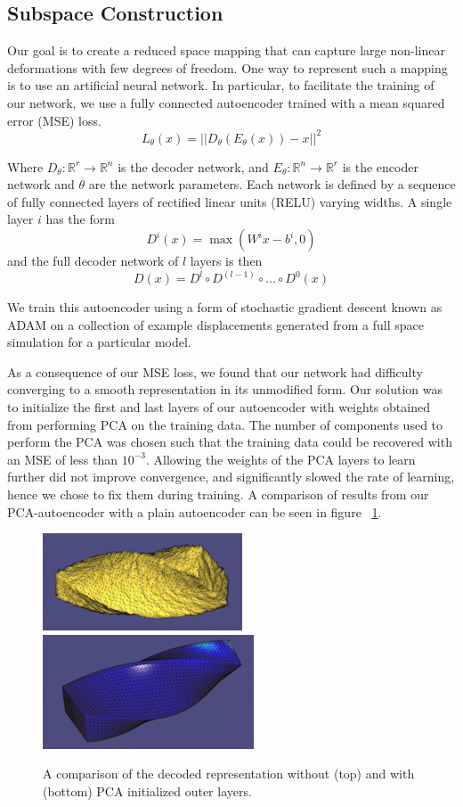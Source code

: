 \documentclass[sigconf, authorversion, review]{acmart}
\begin{document}
\subsection{Subspace Construction}
Our goal is to create a reduced space mapping that can capture large non-linear deformations with few degrees of freedom. One way to represent such a mapping is to use an artificial neural network. In particular, to facilitate the training of our network, we use a fully connected autoencoder trained with a mean squared error (MSE) loss.
$$L_\theta(x)=||D_\theta(E_\theta(x)) - x||^2$$

Where $D_\theta:\mathbb{R}^r\to\mathbb{R}^n$ is the decoder network, and $E_\theta:\mathbb{R}^n\to\mathbb{R}^r$ is the encoder network and $\theta$ are the network parameters. Each network is defined by a sequence of fully connected layers of rectified linear units (RELU) varying widths. A single layer $i$ has the form
$$D^i(x)=\max(W^i x - b^i, 0)$$
and the full decoder network of $l$ layers is then
$$D(x)=D^l\circ D^{(l-1)}\circ \dots \circ D^0(x)$$

We train this autoencoder using a form of stochastic gradient descent known as ADAM \cite{adam} on a collection of example displacements generated from a full space simulation for a particular model.

As a consequence of our MSE loss, we found that our network had difficulty converging to a smooth representation in its unmodified form. Our solution was to initialize the first and last layers of our autoencoder with weights obtained from performing PCA on the training data. The number of components used to perform the PCA was chosen such that the training data could be recovered with an MSE of less than $10^{-3}$. Allowing the weights of the PCA layers to learn further did not improve convergence, and significantly slowed the rate of learning, hence we chose to fix them during training. A comparison of results from our PCA-autoencoder with a plain autoencoder can be seen in figure ~\ref{fig:noisy}. 

\begin{figure}[ht!]
\includegraphics[width=.35\textwidth]{figures/noisy-bar}\hfill
\includegraphics[width=.35\textwidth]{figures/smooth-bar}
\caption{A comparison of the decoded representation without (top) and with (bottom) PCA initialized outer layers.}
\label{fig:noisy}
\end{figure}
\end{document}
